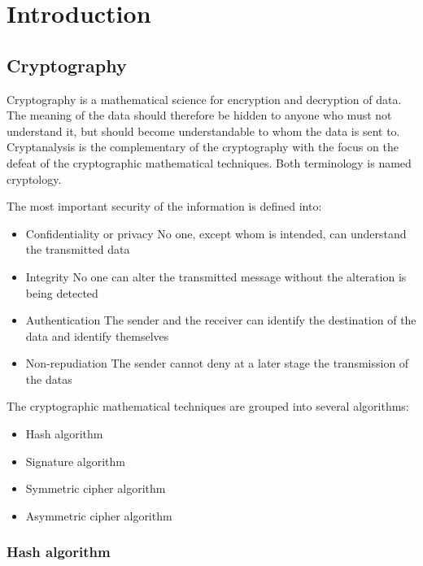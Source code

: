 ﻿\chapter{Introduction}
\label{intro}

\section{Cryptography} %
Cryptography is a mathematical science for encryption and decryption of
data. The meaning of the data should therefore be hidden to anyone who must
not understand it, but should become understandable to whom the data is
sent to.\newline
Cryptanalysis is the complementary of the cryptography
with the focus on the defeat of the cryptographic mathematical
techniques.\newline
Both terminology is named cryptology.

The most important security of the information is defined into:
\begin{itemize}
  \item Confidentiality or privacy\newline
  No one, except whom is intended, can understand the transmitted data
  \item Integrity\newline
  No one can alter the transmitted message without the alteration is being
  detected
  \item Authentication \newline
  The sender and the receiver can identify the destination of the data and
  identify themselves
  \item Non-repudiation\newline
  The sender cannot deny at a later stage the transmission of the datas\newline
\end{itemize}
The cryptographic mathematical techniques are grouped into several algorithms:
\begin{itemize}[noitemsep]
  \item Hash algorithm
  \item Signature algorithm
  \item Symmetric cipher algorithm
  \item Asymmetric cipher algorithm
\end{itemize}

\subsection{Hash algorithm}
\label{intro_hash}

